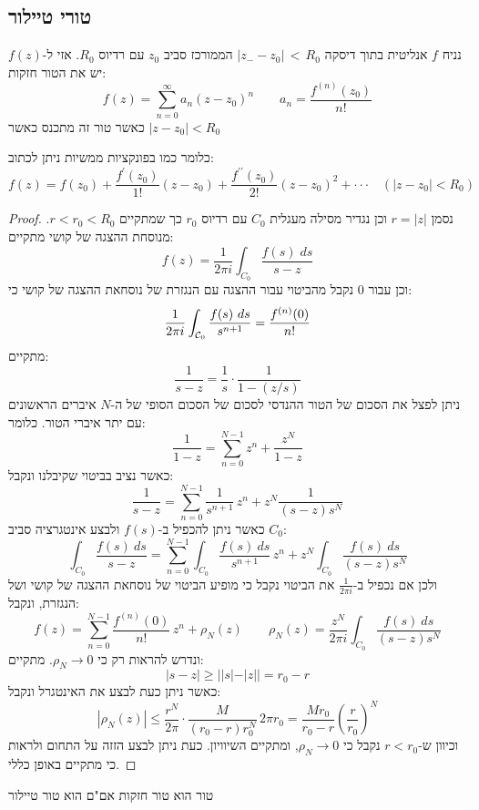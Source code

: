 \documentclass{tstextbook}
\begin{document}
\subsection{טורי טיילור}

\begin{theorem}[טיילור]
נניח \(f\) אנליטית בתוך דיסקה \(|z_{\mathrm{-}}-z_{0}|\,<\,R_{0}\) הממורכז סביב \(z_{0}\) עם רדיוס \(R_{0}\). אזי ל-\(f(z)\) יש את הטור חזקות:
$$f(z)=\sum_{n=0}^{\infty}a_{n}(z-z_{0})^{n} \qquad a_{n}={\frac{f^{(n)}(z_{0})}{n!}}$$
כאשר טור זה מתכנס כאשר \(|z-z_{0}|<R_{0}\)

\end{theorem}
כלומר כמו בפונקציות ממשיות ניתן לכתוב:
$$f(z)=f(z_{0})+\frac{f^{\prime}(z_{0})}{1!}(z-z_{0})+\frac{f^{\prime\prime}(z_{0})}{2!}(z-z_{0})^{2}+\cdot\cdot\cdot\quad(\left|z-z_{0}\right|<R_{0})$$

\begin{proof}
נסמן \(r=|z|\) וכן נגדיר מסילה מעגלית \(C_{0}\) עם רדיוס \(r_{0}\) כך שמתקיים \(r<r_{0}<R_{0}\).
מנוסחת ההצגה של קושי מתקיים:
$$f(z)={\frac{1}{2\pi i}}\int_{C_{0}}{\frac{f(s)\;d s}{s-z}}$$
וכן עבור 0 נקבל מהביטוי עבור ההצגה עם הנגזרת של נוסחאת ההצגה של קושי כי:
$$\frac{1}{2\pi i}\int_{{\cal C}_{0}}\frac{f(s)~d s}{s^{n+1}}=\frac{f^{(n)}(0)}{n!}$$
מתקיים:
$$\frac{1}{s-z}=\frac{1}{s}\cdot\frac{1}{1-(z/s)}$$
 ניתן לפצל את הסכום של הטור ההנדסי לסכום של הסכום הסופי של ה-\(N\) איברים הראשונים עם יתר איברי הטור. כלומר:
$$\frac{1}{1-z}=\sum_{n=0}^{N-1}z^{n}+\frac{z^{N}}{1-z}$$
כאשר נציב בביטוי שקיבלנו ונקבל:
$$\frac{1}{s-z}=\sum_{n=0}^{N-1}\frac{1}{s^{n+1}}\,z^{n}+z^{N}\frac{1}{(s-z)s^{N}}$$
כאשר ניתן להכפיל ב-\(f(s)\) ולבצע אינטגרציה סביב \(C_{0}\):
$$\int_{C_{0}}{\frac{f(s)\ d s}{s-z}}=\sum_{n=0}^{N-1}\int_{C_{0}}{\frac{f(s)\ d s}{s^{n+1}}}\,z^{n}+z^{N}\int_{C_{0}}{\frac{f(s)\ d s}{(s-z)s^{N}}}$$
ולכן אם נכפיל ב-\(\frac{1}{2\pi i}\) את הביטוי נקבל כי מופיע הביטוי של נוסחאת ההצגה של קושי ושל הנגזרת, ונקבל:
$$f(z)=\sum_{n=0}^{N-1}\frac{f^{(n)}(0)}{n!}\,z^{n}+\rho_{N}(z) \qquad \rho_{N}(z)=\frac{z^{N}}{2\pi i}\int_{C_{0}}\frac{f(s)\ d s}{(s-z)s^{N}}$$
ונדרש להראות רק כי \(\rho_{N}\to 0\). מתקיים:
$$|s-z|\geq||s|-|z||=r_{0}-r$$
כאשר ניתן כעת לבצע את האינטגרל ונקבל:
$$|\rho_{N}(z)|\leq{\frac{r^{N}}{2\pi}}\cdot{\frac{M}{(r_{0}-r)r_{0}^{N}}}\,2\pi r_{0}={\frac{M r_{0}}{r_{0}-r}}\left({\frac{r}{r_{0}}}\right)^{N}$$
וכיוון ש-\(r<r_{0}\) נקבל כי \(\rho_{N}\to 0\), ומתקיים השיוויון. כעת ניתן לבצע הזזה על התחום ולראות כי מתקיים באופן כללי.

\end{proof}
\begin{proposition}
טור הוא טור חזקות אם"ם הוא טור טיילור

\end{proposition}
\end{document}
